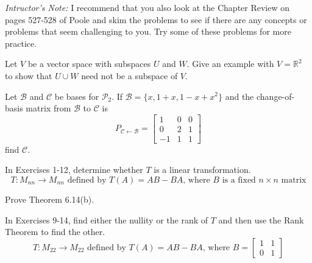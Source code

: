 \documentclass[12pt,letterpaper]{hmcpset}
\newcommand{\RR}{\mathbb{R}}
\newcommand{\m}[1]{\begin{bmatrix} #1 \end{bmatrix}}
\begin{document}

\noindent
\emph{Intructor's Note:} I recommend that you also look at the Chapter Review on
pages 527-528 of Poole and skim the problems to see if there are any concepts or
problems that seem challenging to you. Try some of these problems for more
practice.

\begin{problem}[Poole 6.1.47]
    Let $V$ be a vector space with subspaces $U$ and $W$. Give an
    example with $V=\RR^2$ to show that $U\cup W$ need not be a
    subspace of $V$.
\end{problem}
\begin{solution}
    \vfill
\end{solution}
\newpage

\begin{problem}[Poole 6.3.16]
    Let $\mathcal{B}$ and $\mathcal{C}$ be bases for
    $\mathscr{P}_2$. If $\mathcal{B}=\{x,1+x,1-x+x^2\}$ and the
    change-of-basis matrix from $\mathcal{B}$ to $\mathcal{C}$ is
    \[
        P_{\mathcal{C}\leftarrow\mathcal{B}}=\m{1&0&0\\0&2&1\\-1&1&1}
    \]
    find $\mathcal{C}$.
\end{problem}
\begin{solution}
    \vfill
\end{solution}
\newpage

\begin{problem}[Poole 6.4.4]
    In Exercises 1-12, determine whether $T$ is a linear transformation.
    \[
        T:M_{nn}\to M_{nn}\text{ defined by }T(A)=AB-BA\text{, where }B
        \text{ is a fixed }n\times n\text{ matrix}
    \]
\end{problem}
\begin{solution}
    \vfill
\end{solution}
\newpage

\begin{problem}[Poole 6.4.21]
    Prove Theorem 6.14(b).
\end{problem}
\begin{solution}
    \vfill
\end{solution}
\newpage

\begin{problem}[Poole 6.5.12]
    In Exercises 9-14, find either the nullity or the rank of $T$ and
    then use the Rank Theorem to find the other.
    \[
        T:M_{22}\to M_{22}\text{ defined by }T(A)=AB-BA\text{, where }
        B=\m{1&1\\0&1}
    \]
\end{problem}
\begin{solution}
    \vfill
\end{solution}
\newpage
\end{document}
